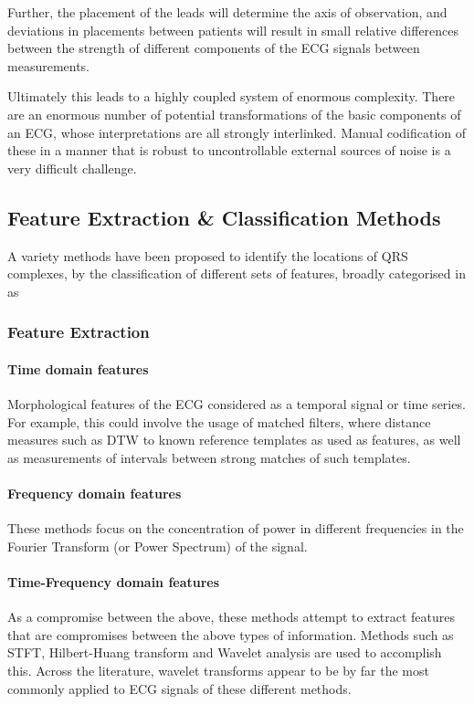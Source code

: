 \documentclass[9pt,conference]{IEEEtran}
\begin{document}
 Further, the placement of the leads will determine the axis of observation, and deviations in placements between patients will result in small relative differences between the strength of different components of the ECG signals between measurements.

Ultimately this leads to a highly coupled system of enormous complexity. There are an enormous number of potential transformations of the basic components of an ECG, whose interpretations are all strongly interlinked. Manual codification of these in a manner that is robust to uncontrollable external sources of noise is a very difficult challenge.

\subsection{Feature Extraction \& Classification Methods}
A variety methods have been proposed to identify the locations of QRS complexes, by the classification of different sets of features, broadly categorised in \cite{Gupta2021Oct} as

\subsubsection{Feature Extraction}
\paragraph{\textbf{Time domain features}}
Morphological features of the ECG considered as a temporal signal or time series. For example, this could involve the usage of matched filters, where distance measures such as DTW to known reference templates as used as features, as well as measurements of intervals between strong matches of such templates.

\paragraph{\textbf{Frequency domain features}}
These methods focus on the concentration of power in different frequencies in the Fourier Transform (or Power Spectrum) of the signal.

\paragraph{\textbf{Time-Frequency domain features}}
As a compromise between the above, these methods attempt to extract features that are compromises between the above types of information. Methods such as STFT, Hilbert-Huang transform and Wavelet analysis are used to accomplish this. Across the literature, wavelet transforms appear to be by far the most commonly applied to ECG signals of these different methods.
\end{document}
